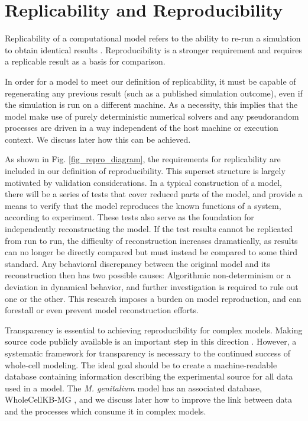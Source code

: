 \documentclass[journal,transmag,twoside]{IEEEtran}
\begin{document}
\section{Replicability and Reproducibility}

Replicability of a computational model refers to the ability to
re-run a simulation to obtain identical results \cite{easterbrook2014open}.
Reproducibility is a stronger requirement and requires a replicable result as a basis for comparison.

In order for a model to meet our definition of replicability,
it must be capable of regenerating any previous result (such as a published simulation outcome),
even if the simulation is run on a different machine.
As a necessity, this implies that the model make use of purely deterministic numerical solvers
and any pseudorandom processes are driven in a way independent of the host machine or execution context.
We discuss later how this can be achieved.

As shown in Fig. \ref{fig_repro_diagram}, the requirements for replicability are
included in our definition of reproducibility.
This superset structure is largely motivated by validation considerations.
In a typical construction of a model, there will be a series of tests
that cover reduced parts of the model, and provide a means to verify
that the model reproduces the known functions of a system, according to experiment.
These tests also serve as the foundation for independently reconstructing the model.
If the test results cannot be replicated from run to run, the difficulty of reconstruction
increases dramatically, as results can no longer be directly compared but must instead
be compared to some third standard.
Any behavioral discrepancy between the original model and its reconstruction
then has two possible causes: Algorithmic non-determinism or a deviation in dynamical
behavior, and further investigation is required to rule out one or the other.
This research imposes a burden on model reproduction, and can forestall or even prevent
model reconstruction efforts.

Transparency is essential to achieving reproducibility for complex models.
Making source code publicly available is an important step in this direction \cite{easterbrook2014open}.
However, a systematic framework for transparency is necessary to the continued success of whole-cell modeling.
The ideal goal should be to create a machine-readable database containing information describing the experimental source for all data used in a model.
The \textit{M. genitalium} model has an associated database, WholeCellKB-MG \cite{karr2013wholecellkb},
and we discuss later how to improve the link between data and the processes which consume it in complex models.
\end{document}
